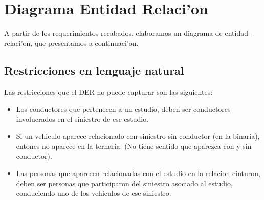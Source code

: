 \section{Diagrama Entidad Relaci'on}

A partir de los requerimientos recabados, elaboramos un diagrama de entidad-relaci'on, que presentamos a continuaci'on.



\subsection{Restricciones en lenguaje natural}

Las restricciones que el DER no puede capturar son las siguientes:

\begin{itemize}
\item Los conductores que pertenecen a un estudio, deben ser conductores involucrados en el siniestro de ese estudio.
\item Si un vehiculo aparece relacionado con siniestro sin conductor (en la binaria), entones no aparece en la ternaria. (No tiene sentido que aparezca con y sin conductor).
\item Las personas que aparecen relacionadas con el estudio en la relacion cinturon, deben ser personas que participaron del siniestro asociado al estudio, conduciendo uno de los vehiculos de ese siniestro.
\end{itemize}
